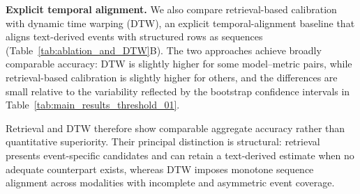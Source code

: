 \documentclass{ws-procs11x85}
\newif\ifshowrebuttalcolor
\newcommand{\rebuttal}[1]{%
  \ifshowrebuttalcolor
    \textcolor{rebuttalblue}{#1}%
  \else
    #1%
  \fi
}
\begin{document}
\noindent\textbf{Explicit temporal alignment.}
We also compare retrieval-based calibration with dynamic time warping (DTW), an explicit temporal-alignment baseline that aligns text-derived events with structured rows as sequences (Table~\ref{tab:ablation_and_DTW}B). The two approaches achieve broadly comparable accuracy: DTW is slightly higher for some model--metric pairs, while retrieval-based calibration is slightly higher for others, and the differences are small relative to the variability reflected by the bootstrap confidence intervals in Table~\ref{tab:main_results_threshold_01}.  \rebuttal{Retrieval and DTW therefore show comparable aggregate accuracy rather than quantitative superiority. Their principal distinction is structural: retrieval presents event-specific candidates and can retain a text-derived estimate when no adequate counterpart exists, whereas DTW imposes monotone sequence alignment across modalities with incomplete and asymmetric event coverage.}


\vspace{-1em}
\end{document}
